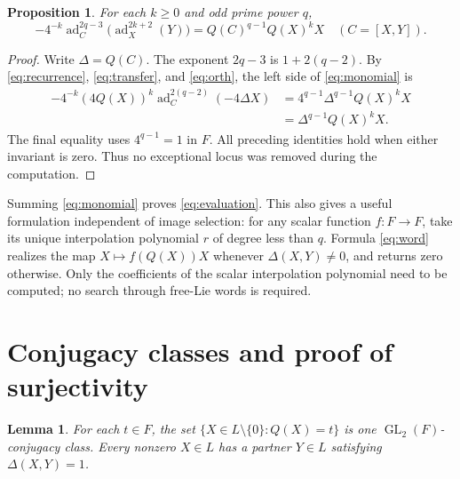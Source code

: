 \documentclass[11pt]{article}
\newtheorem{proposition}[theorem]{Proposition}
\newtheorem{lemma}[theorem]{Lemma}
\newcommand{\ad}{\operatorname{ad}}
\newcommand{\GL}{\operatorname{GL}}
\begin{document}
\begin{proposition}\label{prop:lift}
For each $k\geq0$ and odd prime power $q$,
\begin{equation}\label{eq:monomial}
 -4^{-k}\ad_C^{2q-3}\bigl(\ad_X^{2k+2}(Y)\bigr)
       =Q(C)^{q-1}Q(X)^kX
       \quad(C=[X,Y]).
\end{equation}
\end{proposition}

\begin{proof}
Write $\Delta=Q(C)$. The exponent $2q-3$ is $1+2(q-2)$.
By \eqref{eq:recurrence}, \eqref{eq:transfer}, and \eqref{eq:orth}, the
left side of \eqref{eq:monomial} is
\begin{align*}
 -4^{-k}(4Q(X))^k\ad_C^{2(q-2)}(-4\Delta X)
 &=4^{q-1}\Delta^{q-1}Q(X)^kX\\
 &=\Delta^{q-1}Q(X)^kX.
\end{align*}
The final equality uses $4^{q-1}=1$ in $F$.
All preceding identities hold when either invariant is zero. Thus no
exceptional locus was removed during the computation.
\end{proof}

Summing \eqref{eq:monomial} proves \eqref{eq:evaluation}. This also gives a
useful formulation independent of image selection: for any scalar function
$f:F\to F$, take its unique interpolation polynomial $r$ of degree less
than $q$. Formula \eqref{eq:word} realizes the map $X\mapsto f(Q(X))X$
whenever $\Delta(X,Y)\neq0$, and returns zero otherwise.
Only the coefficients of the scalar interpolation polynomial need to be
computed; no search through free-Lie words is required.

\section{Conjugacy classes and proof of surjectivity}
\begin{lemma}\label{lem:companion}
For each $t\in F$, the set
$\{X\in L\setminus\{0\}:Q(X)=t\}$ is one $\GL_2(F)$-conjugacy class.
Every nonzero $X\in L$ has a partner $Y\in L$ satisfying
$\Delta(X,Y)=1$.
\end{lemma}
\end{document}
